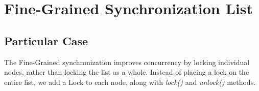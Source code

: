 


\section{\textbf{Fine-Grained Synchronization List}}



\subsection{Particular Case}
\par
The Fine-Grained synchronization improves concurrency by locking individual nodes, rather than locking the list as a whole. Instead of placing a lock on the entire list, we add a Lock to each node, along with \textit{lock()} and \textit{unlock()} methods.
\par




